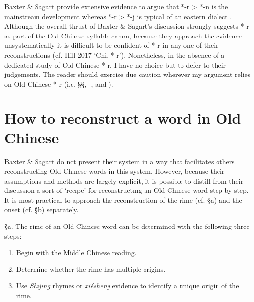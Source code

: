 Baxter \& Sagart provide extensive evidence to argue that *-r
\textgreater{} *-n is the mainstream development whereas *-r
\textgreater{} *-j is typical of an eastern dialect 
\citeyearpar[252-268]{Baxter2014OldChinese}.
Although the overall thrust of Baxter \& Sagart's discussion strongly
suggests *-r as part of the Old Chinese syllable canon, because they
approach the evidence unsystematically it is difficult to be confident
of *-r in any one of their reconstructions (cf. Hill 2017 `Chi. *-r').
Nonetheless, in the absence of a dedicated study of Old Chinese *-r, I
have no choice but to defer to their judgements. The reader should
exercise due caution wherever my argument relies on Old Chinese *-r
(i.e. §§, -, and ).

\section{How to reconstruct a word in Old
Chinese}

\paragraph{}
\label{par:how-to-reconstruct-a-word-in-old-chinese}
Baxter \& Sagart do not present their system in a way that
facilitates others reconstructing Old Chinese words in this system.
However, because their assumptions and methods are largely explicit, it
is possible to distill from their discussion a sort of `recipe' for
reconstructing an Old Chinese word step by step. It is most practical to
approach the reconstruction of the rime (cf. §a) and the onset (cf. §b)
separately.

§a. The rime of an Old Chinese word can be determined with the following
three steps:

\begin{enumerate}
\item  Begin with the Middle Chinese reading.

\item Determine whether the rime has multiple origins.

\item Use  \emph{Shījīng} rhymes or  \emph{xiéshēng} evidence to identify a
unique origin of the rime.
\end{enumerate}

